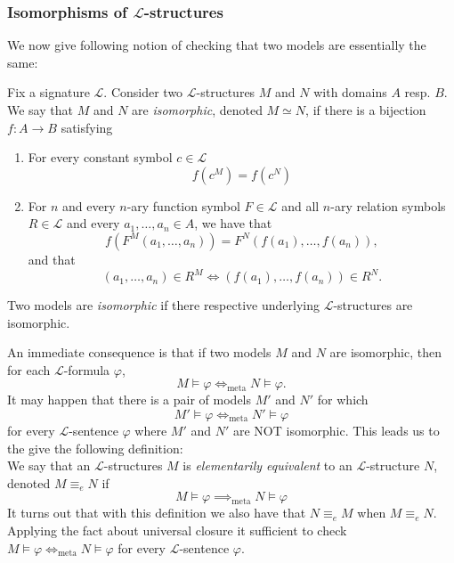 \subsubsection{Isomorphisms of $\mathcal{L}$-structures}
We now give following notion of checking that two models are essentially the same:
\begin{definition}
    Fix a signature $\mathcal{L}$. Consider two $\mathcal{L}$-structures $M$ and $N$ with domains $A$ resp. $B$. We say that $M$ and $N$ are \emph{isomorphic}, denoted $M\simeq N$, if there is a bijection $f:A\rightarrow B$ satisfying
    \begin{enumerate}
        \item For every constant symbol $c\in \mathcal{L}$ 
        $$f(c^M)=f(c^N)$$
        \item For $n$ and every $n$-ary function symbol $F\in \mathcal{L}$ and all $n$-ary relation symbols $R\in\mathcal{L}$ and every $a_1,\dots,a_n\in A$, we have that 
        $$
            f(F^M(a_1,\dots,a_n))=F^{N}(f(a_1),\dots,f(a_n)),
        $$
        and that 
        $$
            (a_1,\dots,a_n)\in R^M \iff (f(a_1),\dots,f(a_n)) \in R^N.
        $$
    \end{enumerate}
    Two models are \emph{isomorphic} if there respective underlying $\mathcal{L}$-structures are isomorphic.   
\end{definition}
\begin{remark}
    An immediate consequence is that if two models $M$ and $N$ are isomorphic, then for each $\mathcal{L}$-formula $\varphi$, 
    $$M\vDash \varphi \iff_{\mathrm{meta}} N\vDash \varphi.$$
    It may happen that there is a pair of models $M'$ and $N'$ for which
    $$M'\vDash\varphi \iff_{\mathrm{meta}} N' \vDash \varphi$$
    for every $\mathcal{L}$-sentence $\varphi$ where $M'$ and $N'$ are NOT isomorphic. This leads us to the give the following definition:\\
    We say that an $\mathcal{L}$-structures $M$ is \emph{elementarily equivalent} to an $\mathcal{L}$-structure $N$, denoted $M\equiv_e N$ if 
    $$ M\vDash \varphi \implies_{\mathrm{meta}} N \vDash \varphi$$
    It turns out that with this definition we also have that $N\equiv _e M$ when $M\equiv_e N$. Applying the fact about universal closure it sufficient to check $M\vDash \varphi \iff_{\mathrm{meta}} N\vDash \varphi$ for every $\mathcal{L}$-sentence $\varphi$.    
\end{remark}
